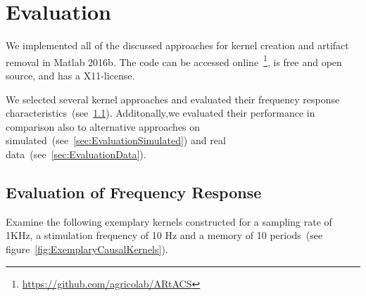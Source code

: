 \documentclass[a4paper]{article}
\newcommand{\figref}[1]{(see figure~\ref{#1})}
\begin{document}
\section{Evaluation}
We implemented all of the discussed approaches for kernel creation and artifact removal in Matlab 2016b. The code can be accessed online~\footnote{\url{https://github.com/agricolab/ARtACS}}, is free and open source, and has a X11-license.

We selected several kernel approaches and evaluated their frequency response characteristics~(see~\ref{sec:EvaluationFreq}). Additonally,we evaluated their performance in comparison also to alternative approaches on simulated~(see~\ref{sec:EvaluationSimulated}) and real data~(see~\ref{sec:EvaluationData}).

\subsection{Evaluation of Frequency Response}\label{sec:EvaluationFreq}

Examine the following exemplary kernels constructed for a sampling rate of 1KHz, a stimulation frequency of 10 Hz and a memory of 10 periods~\figref{fig:ExemplaryCausalKernels}.
\end{document}
